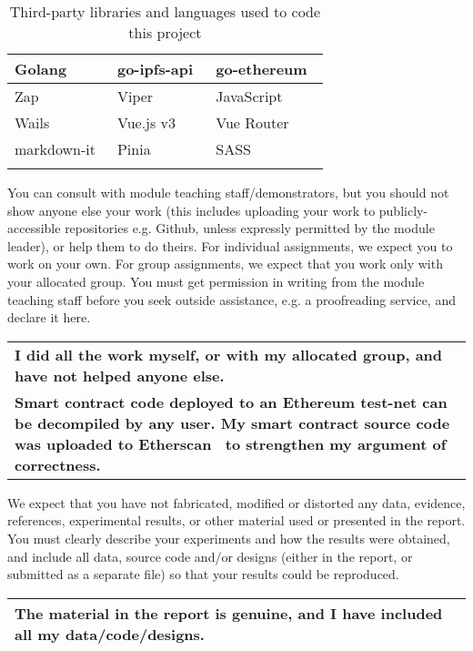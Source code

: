 \begin{longtable}[ht]{ | l | l | l | }
  \hline
  Golang~\cite{noauthor_go_nodate}
  &  go-ipfs-api~\cite{noauthor_go-ipfs-api_2023}
  & go-ethereum~\cite{noauthor_go-ethereum_nodate}
  \\\hline
  Zap~\cite{noauthor_zap_2023}
  & Viper~\cite{noauthor_viper_nodate}
  & JavaScript~\cite{noauthor_nodejs_nodate}
  \\\hline
  Wails~\cite{noauthor_wails_nodate}
  & Vue.js v3~\cite{noauthor_vuejs_nodate}
  & Vue Router~\cite{noauthor_vue_nodate}
  \\\hline
  markdown-it~\cite{noauthor_markdown-it_2023}
  & Pinia~\cite{noauthor_pinia_nodate}
  & SASS~\cite{noauthor_sass_nodate}
  \\\hline
  \caption{Third-party libraries and languages used to code this project}
  \label{tab:tools-soo}
\end{longtable}

\noindent You can consult with module teaching staff/demonstrators, but you should not show anyone else
your work (this includes uploading your work to publicly-accessible repositories e.g. Github, unless
expressly permitted by the module leader), or help them to do theirs. For individual assignments,
we expect you to work on your own. For group assignments, we expect that you work only with
your allocated group. You must get permission in writing from the module teaching staff before
you seek outside assistance, e.g. a proofreading service, and declare it here.

\begin{longtable}[ht]{ | p{\textwidth} | }
  \hline
  \textbf{I did all the work myself, or with my allocated group, and have not helped anyone else.}
  \\
  \textbf{Smart contract code deployed to an Ethereum test-net can be decompiled by any user. My smart contract source code was uploaded to Etherscan~\cite{etherscanio_library_nodate} to strengthen my argument of correctness.}
  \\\hline
\end{longtable}

\noindent We expect that you have not fabricated, modified or distorted any data, evidence, references,
experimental results, or other material used or presented in the report. You must clearly describe
your experiments and how the results were obtained, and include all data, source code and/or
designs (either in the report, or submitted as a separate file) so that your results could be
reproduced. 
\vspace{4mm}
\begin{longtable}[ht]{ | p{\textwidth} | }
  \hline
  \textbf{The material in the report is genuine, and I have included all my data/code/designs. }
  \\\hline
\end{longtable}

